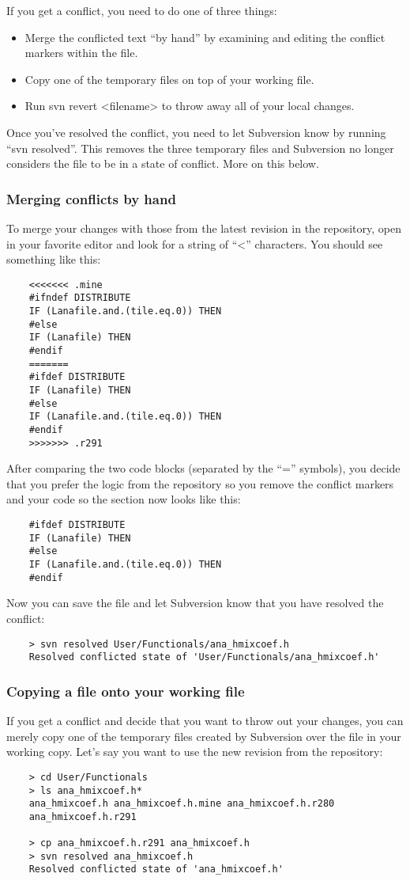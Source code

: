If you get a conflict, you need to do one of three things:
\begin{itemize}
        \item Merge the conflicted text “by hand” by examining and
     editing the conflict markers within the file.
        \item Copy one of the temporary files on top of your working file.
        \item Run svn revert <filename> to throw away all of your local
     changes.
\end{itemize}
Once you've resolved the conflict, you need to let Subversion know by
running ``svn resolved''. This removes the three temporary files and
Subversion no longer considers the file to be in a state of conflict. More
on this below.

\subsubsection{Merging conflicts by hand}
To merge your changes with those from the latest revision in the repository,
open  in your favorite editor and
look for a string of ``<'' characters. You should see something like this:
\begin{verbatim}
    <<<<<<< .mine
    #ifndef DISTRIBUTE
    IF (Lanafile.and.(tile.eq.0)) THEN
    #else
    IF (Lanafile) THEN
    #endif
    =======
    #ifdef DISTRIBUTE
    IF (Lanafile) THEN
    #else
    IF (Lanafile.and.(tile.eq.0)) THEN
    #endif
    >>>>>>> .r291
\end{verbatim}
After comparing the two code blocks (separated by the ``='' symbols), you
decide that you prefer the logic from the repository so you remove the
conflict markers and your code so the section now looks like this:
\begin{verbatim}
    #ifdef DISTRIBUTE
    IF (Lanafile) THEN
    #else
    IF (Lanafile.and.(tile.eq.0)) THEN
    #endif
\end{verbatim}

Now you can save the file and let Subversion know that you have resolved the
conflict:
\begin{verbatim}
    > svn resolved User/Functionals/ana_hmixcoef.h
    Resolved conflicted state of 'User/Functionals/ana_hmixcoef.h'
\end{verbatim}

\subsubsection{Copying a file onto your working file}
If you get a conflict and decide that you want to throw out your changes,
you can merely copy one of the temporary files created by Subversion over
the file in your working copy. Let's say you want to use the new revision
from the repository:
\begin{verbatim}
    > cd User/Functionals
    > ls ana_hmixcoef.h*
    ana_hmixcoef.h ana_hmixcoef.h.mine ana_hmixcoef.h.r280
    ana_hmixcoef.h.r291

    > cp ana_hmixcoef.h.r291 ana_hmixcoef.h
    > svn resolved ana_hmixcoef.h
    Resolved conflicted state of 'ana_hmixcoef.h'
\end{verbatim}


